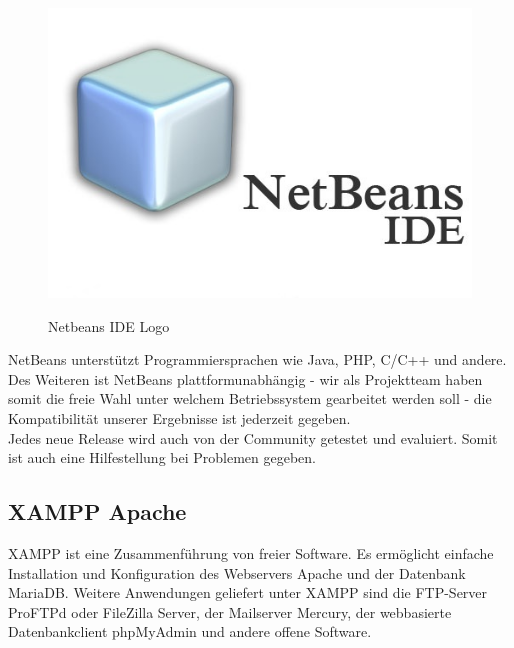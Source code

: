 	\begin{figure}
		\vspace{-1cm}
		\begin{center}
			\caption{Netbeans IDE Logo}
			\vspace{.5cm}
			\includegraphics[scale=.39]{figures/netbeans_logo.jpg}
			
			\label{Netbeans_Logo}
		\end{center}
	\end{figure}
	
	NetBeans unterstützt Programmiersprachen wie Java, PHP, C/C++ und andere. Des Weiteren ist NetBeans plattformunabhängig - wir als Projektteam haben somit die freie Wahl unter welchem Betriebssystem gearbeitet werden soll - die Kompatibilität unserer Ergebnisse ist jederzeit gegeben.
	\\
	Jedes neue Release wird auch von der Community getestet und evaluiert. Somit ist auch eine Hilfestellung bei Problemen gegeben.
	\subsection{XAMPP Apache}
	XAMPP ist eine Zusammenführung von freier Software. Es ermöglicht einfache Installation und Konfiguration des Webservers Apache und der Datenbank MariaDB. Weitere Anwendungen geliefert unter XAMPP sind die FTP-Server ProFTPd oder FileZilla Server, der Mailserver Mercury, der webbasierte Datenbankclient phpMyAdmin und andere offene Software.
	
